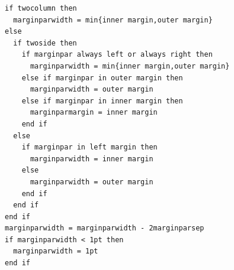 \documentclass[10pt,a4paper,extrafontsizes]{memoir}
\newcommand{\PWnote}[2]{}
\begin{document}
\noindent
\begin{framed}
  \baselineskip
  \begin{small}
\begin{verbatim}
if twocolumn then
  marginparwidth = min{inner margin,outer margin}
else
  if twoside then
    if marginpar always left or always right then
      marginparwidth = min{inner margin,outer margin}
    else if marginpar in outer margin then
      marginparwidth = outer margin
    else if marginpar in inner margin then
      marginparmargin = inner margin
    end if
  else
    if marginpar in left margin then
      marginparwidth = inner margin
    else
      marginparwidth = outer margin
    end if
  end if
end if
marginparwidth = marginparwidth - 2marginparsep
if marginparwidth < 1pt then
  marginparwidth = 1pt
end if
\end{verbatim}
  \end{small}
\end{framed}







\backmatter

\PWnote{2009/07/08}{Changed \cs{toclevel@section} so that Notes 
                    divisions appear in the bookmarks}
\makeatletter\renewcommand*{\toclevel@chapter}{-1}\makeatother 
\makeatletter\renewcommand*{\toclevel@section}{0}\makeatother
\clearpage
\printpagenotes
\clearpage
\pagestyle{plainmarkruled}

\renewcommand*{\begintheglossaryhook}{\small}
\printglossary

\renewcommand{\prebibhook}{%
\ctan\ is the \cTeXan. Information on how to
access CTAN is available at \url{http://www.tug.org}.
\par\vspace{\onelineskip}}

\nocite{*}


 


\clearpage
\twocolindex
\pagestyle{index}
\renewcommand{\preindexhook}{%
The first page number is usually, but not always, the primary reference to
the indexed topic.\vskip\onelineskip}
\indexintoc
\end{document}
